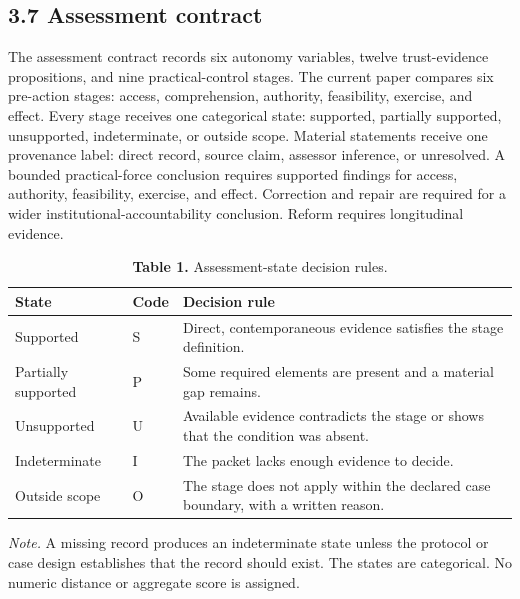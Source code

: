 \documentclass[11pt]{article}
\begin{document}
\subsection*{3.7 Assessment contract}
The assessment contract records six autonomy variables, twelve trust-evidence propositions, and nine practical-control stages. The current paper compares six pre-action stages: access, comprehension, authority, feasibility, exercise, and effect. Every stage receives one categorical state: supported, partially supported, unsupported, indeterminate, or outside scope. Material statements receive one provenance label: direct record, source claim, assessor inference, or unresolved.
A bounded practical-force conclusion requires supported findings for access, authority, feasibility, exercise, and effect. Correction and repair are required for a wider institutional-accountability conclusion. Reform requires longitudinal evidence.
\begin{table}[!htbp]
\centering
\caption*{\textcolor{TAENavy}{\textbf{Table 1.}} Assessment-state decision rules.}
\footnotesize
{}
\begin{tabularx}{\linewidth}{@{}>{\raggedright\arraybackslash}p{}>{\centering\arraybackslash}p{}>{\raggedright\arraybackslash}X@{}}
\toprule
\rowcolor{TAEPaleNavy}
\textcolor{TAENavy}{\textbf{State}} & \textcolor{TAENavy}{\textbf{Code}} & \textcolor{TAENavy}{\textbf{Decision rule}} \\
\midrule
Supported & S & Direct, contemporaneous evidence satisfies the stage definition. \\
Partially supported & P & Some required elements are present and a material gap remains. \\
Unsupported & U & Available evidence contradicts the stage or shows that the condition was absent. \\
Indeterminate & I & The packet lacks enough evidence to decide. \\
Outside scope & O & The stage does not apply within the declared case boundary, with a written reason. \\
\bottomrule
\end{tabularx}
\par\vspace{2pt}\footnotesize\textit{Note.} A missing record produces an indeterminate state unless the protocol or case design establishes that the record should exist. The states are categorical. No numeric distance or aggregate score is assigned.
\end{table}
\end{document}
